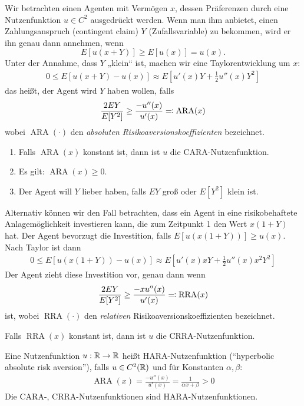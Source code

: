 \documentclass[a4paper,twoside,DIV15,BCOR12mm]{scrbook}
\DeclareMathOperator{\ARA}{ARA}
\DeclareMathOperator{\RRA}{RRA}
\begin{document}
Wir betrachten einen Agenten mit Vermögen $x$, dessen Präferenzen durch eine Nutzenfunktion $u\in C^2$ ausgedrückt werden. Wenn man ihm anbietet, einen Zahlungsanspruch (contingent claim) $Y$ (Zufallsvariable) zu bekommen, wird er ihn genau dann annehmen, wenn \[E[u(x+Y)] \ge E[u(x)] = u(x).\]
Unter der Annahme, dass $Y$ „klein“ ist, machen wir eine Taylorentwicklung um $x$:
\begin{align*}
0\le E[u(x+Y) - u(x)] \approx E[u'(x)Y+ \frac12 u''(x)Y^2]
\end{align*}
das heißt, der Agent wird $Y$ haben wollen, falls 
\begin{align*}
\frac{2EY}{E[Y^2]} \ge \frac{-u''(x)}{u'(x)} \ad \ARA(x)
\end{align*}
wobei $\ARA(\cdot)$ den \emph{absoluten Risikoaversionskoeffizienten} bezeichnet.

\begin{bemerkung}
\begin{enumerate}
\item Falls $\ARA(x)$ konstant ist, dann ist $u$ die CARA-Nutzenfunktion.
\item Es gilt: $\ARA(x) \ge 0$.
\item Der Agent will $Y$ lieber haben, falls $EY$ groß oder $E[Y^2]$ klein ist.
\end{enumerate}
\end{bemerkung}

Alternativ können wir den Fall betrachten, dass ein Agent in eine risikobehaftete Anlagemöglichkeit investieren kann, die zum Zeitpunkt 1 den Wert $x(1+Y)$ hat. Der Agent bevorzugt die Investition, falls $E[u(x(1+Y))] \ge u(x)$. Nach Taylor ist dann
\begin{align*}
0 \le E[u(x(1+Y)) - u(x)] \approx E[u'(x)xY + \frac12 u''(x) x^2 Y^2]
\end{align*}
Der Agent zieht diese Investition vor, genau dann wenn
\[\frac{2EY}{E[Y^2]}\ge \frac {-xu''(x)}{u'(x)} \ad \RRA(x)\]
ist, wobei $\RRA(\cdot)$ den \emph{relativen} Risikoaversionskoeffizienten  bezeichnet.

\begin{bemerkung}
Falls $\RRA(x)$ konstant ist, dann ist $u$ die CRRA-Nutzenfunktion.
\end{bemerkung}

\begin{definition}
Eine Nutzenfunktion $u:\mathbb{R}\to\mathbb{R}$ heißt HARA-Nutzenfunktion (“hyperbolic absolute risk aversion”), falls $u\in C^2(\mathbb{R})$ und für Konstanten $\alpha, \beta$:
\begin{align*}
\ARA(x) = \frac{-u''(x)}{u'(x)} = \frac{1}{\alpha x + \beta} > 0
\end{align*}
Die CARA-, CRRA-Nutzenfunktionen sind HARA-Nutzenfunktionen.
\end{definition}
\end{document}
